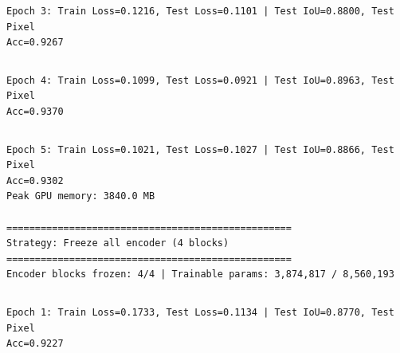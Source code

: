 \documentclass[11pt]{article}
\begin{document}
    \begin{Verbatim}[commandchars=\\\{\}]

    \end{Verbatim}

    \begin{Verbatim}[commandchars=\\\{\}]
Epoch 3: Train Loss=0.1216, Test Loss=0.1101 | Test IoU=0.8800, Test Pixel
Acc=0.9267
    \end{Verbatim}

    \begin{Verbatim}[commandchars=\\\{\}]

    \end{Verbatim}

    \begin{Verbatim}[commandchars=\\\{\}]
Epoch 4: Train Loss=0.1099, Test Loss=0.0921 | Test IoU=0.8963, Test Pixel
Acc=0.9370
    \end{Verbatim}

    \begin{Verbatim}[commandchars=\\\{\}]

    \end{Verbatim}

    \begin{Verbatim}[commandchars=\\\{\}]
Epoch 5: Train Loss=0.1021, Test Loss=0.1027 | Test IoU=0.8866, Test Pixel
Acc=0.9302
Peak GPU memory: 3840.0 MB

==================================================
Strategy: Freeze all encoder (4 blocks)
==================================================
Encoder blocks frozen: 4/4 | Trainable params: 3,874,817 / 8,560,193
    \end{Verbatim}

    \begin{Verbatim}[commandchars=\\\{\}]

    \end{Verbatim}

    \begin{Verbatim}[commandchars=\\\{\}]
Epoch 1: Train Loss=0.1733, Test Loss=0.1134 | Test IoU=0.8770, Test Pixel
Acc=0.9227
    \end{Verbatim}

    \begin{Verbatim}[commandchars=\\\{\}]

    \end{Verbatim}
\end{document}
